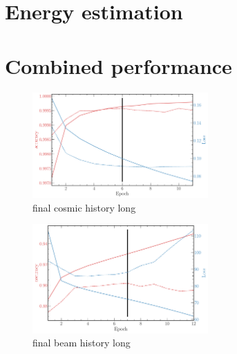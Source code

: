 \section{Energy estimation} %
\label{sec:cvn_energy} %

\section{Combined performance} %
\label{sec:cvn_final} %

\begin{figure} %
    \includegraphics[width=0.6\textwidth]{diagrams/7-cvn/chipsnet/final_cosmic_history.pdf}
    \caption[final cosmic history short]
    {final cosmic history long}
    \label{fig:final_cosmic_history}
\end{figure}

\begin{figure} %
    \includegraphics[width=0.6\textwidth]{diagrams/7-cvn/chipsnet/final_beam_history.pdf}
    \caption[final beam history short]
    {final beam history long}
    \label{fig:final_beam_history}
\end{figure}

